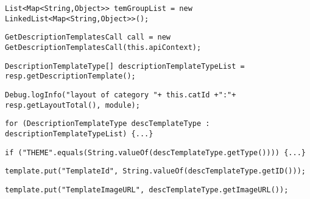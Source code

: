 \noindent\makebox[\linewidth]{\rule{\linewidth}{0.4pt}}
\begin{lstlisting}[firstnumber=224, caption={Line 224 acceptable violation of the rule}]
List<Map<String,Object>> temGroupList = new LinkedList<Map<String,Object>>();
\end{lstlisting}
\noindent\makebox[\linewidth]{\rule{\linewidth}{0.4pt}}
\begin{lstlisting}[firstnumber=226, caption={Line 226 acceptable violation of the rule}]
GetDescriptionTemplatesCall call = new GetDescriptionTemplatesCall(this.apiContext);
\end{lstlisting}
\noindent\makebox[\linewidth]{\rule{\linewidth}{0.4pt}}
\begin{lstlisting}[firstnumber=231, caption={Line 231 acceptable violation of the rule}]
DescriptionTemplateType[] descriptionTemplateTypeList = resp.getDescriptionTemplate();
\end{lstlisting}
\noindent\makebox[\linewidth]{\rule{\linewidth}{0.4pt}}
\begin{lstlisting}[firstnumber=232, caption={Line 232 acceptable violation of the rule}]
Debug.logInfo("layout of category "+ this.catId +":"+ resp.getLayoutTotal(), module);
\end{lstlisting}
\noindent\makebox[\linewidth]{\rule{\linewidth}{0.4pt}}
\begin{lstlisting}[firstnumber=233, caption={Line 233 acceptable violation of the rule}]
for (DescriptionTemplateType descTemplateType : descriptionTemplateTypeList) {...}
\end{lstlisting}
\noindent\makebox[\linewidth]{\rule{\linewidth}{0.4pt}}
\begin{lstlisting}[firstnumber=236, caption={Line 236 acceptable violation of the rule}]
if ("THEME".equals(String.valueOf(descTemplateType.getType()))) {...}
\end{lstlisting}
\noindent\makebox[\linewidth]{\rule{\linewidth}{0.4pt}}
\begin{lstlisting}[firstnumber=238, caption={Line 238 acceptable violation of the rule}]
template.put("TemplateId", String.valueOf(descTemplateType.getID()));
\end{lstlisting}
\noindent\makebox[\linewidth]{\rule{\linewidth}{0.4pt}}
\begin{lstlisting}[firstnumber=239, caption={Line 239 acceptable violation of the rule}]
template.put("TemplateImageURL", descTemplateType.getImageURL());
\end{lstlisting}
\noindent\makebox[\linewidth]{\rule{\linewidth}{0.4pt}}
